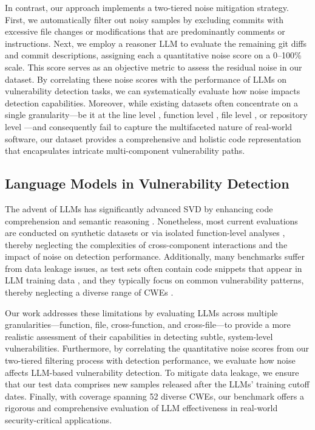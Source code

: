 \documentclass[sigconf,review,anonymous]{acmart}
\begin{document}
In contrast, our approach implements a two-tiered noise mitigation strategy. First, we automatically filter out noisy samples by excluding commits with excessive file changes or modifications that are predominantly comments or instructions. Next, we employ a reasoner LLM to evaluate the remaining git diffs and commit descriptions, assigning each a quantitative noise score on a 0–100\% scale. This score serves as an objective metric to assess the residual noise in our dataset. By correlating these noise scores with the performance of LLMs on vulnerability detection tasks, we can systematically evaluate how noise impacts detection capabilities. Moreover, while existing datasets often concentrate on a single granularity—be it at the line level \cite{fu2022linevul}, function level \cite{zhou2019devign, chakraborty2021deep, chen2023diversevul}, file level \cite{liu2024vuldetectbench}, or repository level \cite{zhou2024comparison}—and consequently fail to capture the multifaceted nature of real-world software, our dataset provides a comprehensive and holistic code representation that encapsulates intricate multi-component vulnerability paths.

\subsection{Language Models in Vulnerability Detection}
The advent of LLMs has significantly advanced SVD by enhancing code comprehension and semantic reasoning \cite{ullah2024llms, zibaeirad2024vulnllmeval}. Nonetheless, most current evaluations are conducted on synthetic datasets or via isolated function-level analyses \cite{khare2023understanding}, thereby neglecting  the complexities of cross-component interactions and the impact of noise on detection performance. Additionally, many benchmarks suffer from data leakage issues, as test sets often contain code snippets that appear in LLM training data \cite{sallou2024breaking, wu2023effective}, and they typically focus on common vulnerability patterns, thereby neglecting a diverse range of CWEs \cite{ullah2024llms, wu2023effective}.

Our work addresses these limitations by evaluating LLMs across multiple granularities—function, file, cross-function, and cross-file—to provide a more realistic assessment of their capabilities in detecting subtle, system-level vulnerabilities. Furthermore, by correlating the quantitative noise scores from our two-tiered filtering process with detection performance, we evaluate how noise affects LLM-based vulnerability detection. To mitigate data leakage, we ensure that our test data comprises new samples released after the LLMs' training cutoff dates. Finally, with coverage spanning 52 diverse CWEs, our benchmark offers a rigorous and comprehensive evaluation of LLM effectiveness in real-world security-critical applications. 
\end{document}
